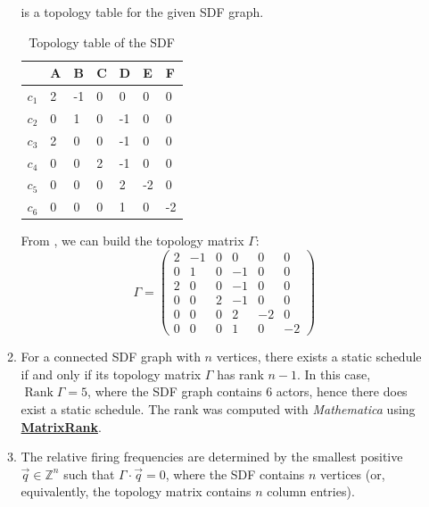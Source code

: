 \documentclass{article}
\newcommand\mma[1]%
    {\href{https://reference.wolfram.com/language/ref/#1.html}{\textbf{#1}}}
\numberwithin{equation}{section}
\numberwithin{table}{section}
\numberwithin{figure}{section}
\DeclareMathOperator\rank{Rank}
\begin{document}
\begin{enumerate}
\begin{enumerate}
             is a topology table for the given SDF graph.
            \begin{table}
                \centering%
                \begin{tabular}{l|llllll}
                          & A  & B & C &  D &  E &  F \\ \toprule
                    $c_1$ & 2 & -1 & 0 &  0 &  0 &  0 \\
                    $c_2$ & 0 &  1 & 0 & -1 &  0 &  0 \\
                    $c_3$ & 2 &  0 & 0 & -1 &  0 &  0 \\
                    $c_4$ & 0 &  0 & 2 & -1 &  0 &  0 \\
                    $c_5$ & 0 &  0 & 0 &  2 & -2 &  0 \\
                    $c_6$ & 0 &  0 & 0 &  1 &  0 & -2 \\
                    \bottomrule
                \end{tabular}
                \caption{Topology table of the SDF}%
                \label{table:sdf}
            \end{table}
            From , we can build the topology matrix $\Gamma$:
            \begin{equation}
                \Gamma = \begin{pmatrix}
                    2 & -1 & 0 &  0 &  0 &  0 \\
                    0 &  1 & 0 & -1 &  0 &  0 \\
                    2 &  0 & 0 & -1 &  0 &  0 \\
                    0 &  0 & 2 & -1 &  0 &  0 \\
                    0 &  0 & 0 &  2 & -2 &  0 \\
                    0 &  0 & 0 &  1 &  0 & -2
                \end{pmatrix}
            \end{equation}
        \item For a connected SDF graph with $n$ vertices, there exists a
            static schedule if and only if its topology matrix $\Gamma$ has
            rank $n-1$. In this case, $\rank{\Gamma} = 5$, where the SDF graph
            contains 6 actors, hence there does exist a static schedule. The
            rank was computed with \emph{Mathematica} using \mma{MatrixRank}.

        \item The relative firing frequencies are determined by the smallest
            positive $\vec{q} \in \mathbb{Z}^n$ such that $\Gamma \cdot \vec{q}
            = 0$, where the SDF contains $n$ vertices (or, equivalently, the
            topology matrix contains $n$ column entries).


\end{enumerate}
\end{enumerate}
\end{document}
